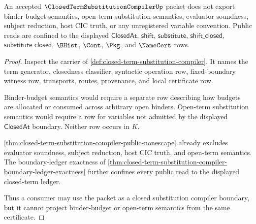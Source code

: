 \begin{theorem}
\label{thm:closed-term-substitution-compiler-binder-budget-nonescape}
An accepted $\ClosedTermSubstitutionCompilerUp$ packet does not export binder-budget semantics, open-term substitution semantics, evaluator soundness, subject reduction, host CIC truth, or any unregistered variable convention. Public reads are confined to the displayed $\mathsf{ClosedAt}$, $\mathsf{shift}$, $\mathsf{substitute}$, $\mathsf{shift\_closed}$, $\mathsf{substitute\_closed}$, $\BHist$, $\Cont$, $\Pkg$, and $\NameCert$ rows.
\end{theorem}
\begin{proof}
Inspect the carrier of \autoref{def:closed-term-substitution-compiler}. It names the term generator, closedness classifier, syntactic operation row, fixed-boundary witness row, transports, routes, provenance, and local certificate row.

Binder-budget semantics would require a separate row describing how budgets are allocated or consumed across arbitrary open binders. Open-term substitution semantics would require a row for variables not admitted by the displayed $\mathsf{ClosedAt}$ boundary. Neither row occurs in $K$.

\autoref{thm:closed-term-substitution-compiler-public-nonescape} already excludes evaluator soundness, subject reduction, host CIC truth, and open-term semantics. The boundary-ledger exactness of \autoref{thm:closed-term-substitution-compiler-boundary-ledger-exactness} further confines every public read to the displayed closed-term ledger.

Thus a consumer may use the packet as a closed substitution compiler boundary, but it cannot project binder-budget or open-term semantics from the same certificate.
\end{proof}

